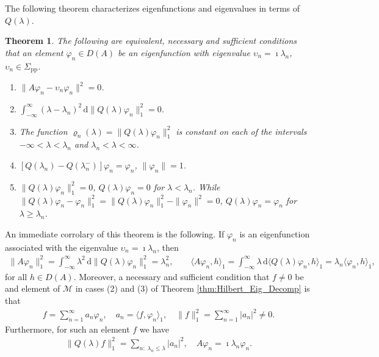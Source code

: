 \documentclass[11pt]{amsart}
\renewcommand{\d}{\mathrm{d}}
\newcommand{\Sigp}{\Sigma_{\text{pp}}}
\renewcommand{\Mc}{\mathcal{M}}
\newtheorem{theorem}{Theorem}[section]
\begin{document}
The following theorem characterizes eigenfunctions and eigenvalues in
terms of $Q(\lambda)$.
%
\begin{theorem}\label{thm:Eig_fun_val}
The following are equivalent, necessary and sufficient conditions that
an element $\varphi_n\in D(A)$ be an eigenfunction with eigenvalue $\upsilon_n=\imath\lambda_n$,
$\upsilon_n\in\Sigp$. 
%
\begin{enumerate}
\item $\|A\varphi_n-\upsilon_n\varphi_n\|^2=0$.
\item $\int_{-\infty}^\infty(\lambda-\lambda_n)^2\,\d\|Q(\lambda)\varphi_n\|_1^2=0$.
\item The function $\varrho_n(\lambda)=\|Q(\lambda)\varphi_n\|_1^2$ is constant on each of the
  intervals $-\infty<\lambda<\lambda_n$ and $\lambda_n<\lambda<\infty$.
\item $[Q(\lambda_n)-Q(\lambda_n^-)]\varphi_n=\varphi_n$, $\|\varphi_n\|=1$.
\item $\|Q(\lambda)\varphi_n\|_1^2=0$, $Q(\lambda)\varphi_n=0$ for $\lambda<\lambda_n$. While
      $\|Q(\lambda)\varphi_n-\varphi_n\|_1^2=\|Q(\lambda)\varphi_n\|_1^2-\|\varphi_n\|^2=0$, $Q(\lambda)\varphi_n=\varphi_n$ for $\lambda\geq\lambda_n$. 
\end{enumerate}
%
\end{theorem}
%
\noindent
An immediate corrolary of this theorem is the following. If $\varphi_n$ is
an eigenfunction associated with the eigenvalue $\upsilon_n=\imath\lambda_n$, then
\cite{Stone:64}   
%
\begin{align}
  \|A\varphi_n\|_1^2=\int_{-\infty}^\infty\lambda^2\,\d\|Q(\lambda)\varphi_n\|_1^2=\lambda_n^2, \qquad
  \langle A\varphi_n,h\rangle_1=\int_{-\infty}^\infty\lambda\,\d\langle Q(\lambda)\varphi_n,h\rangle_1=\lambda_n\langle\varphi_n,h\rangle_1,
\end{align}
%
for all $h\in D(A)$. Moreover, a necessary and sufficient condition that
$f\neq0$ be and element of $\Mc$ in cases (2) and (3) of Theorem
\ref{thm:Hilbert_Eig_Decomp} is that
%
\begin{align}\label{eq:Eig_Fun_Expansion}
  f=\sum_{n=1}^\infty a_n\varphi_n, \quad
  a_n=\langle f,\varphi_n\rangle_1, \quad
  \|f\|_1^2=\sum_{n=1}^\infty|a_n|^2\neq0.
\end{align}
%
Furthermore, for such an element $f$ we have
%
\begin{align}
  \|Q(\lambda)f\|_1^2=\sum_{n:\;\lambda_n\leq\lambda}|a_n|^2, \quad
  A\varphi_n=\imath\lambda_n\varphi_n.
\end{align}
%
\end{document}
